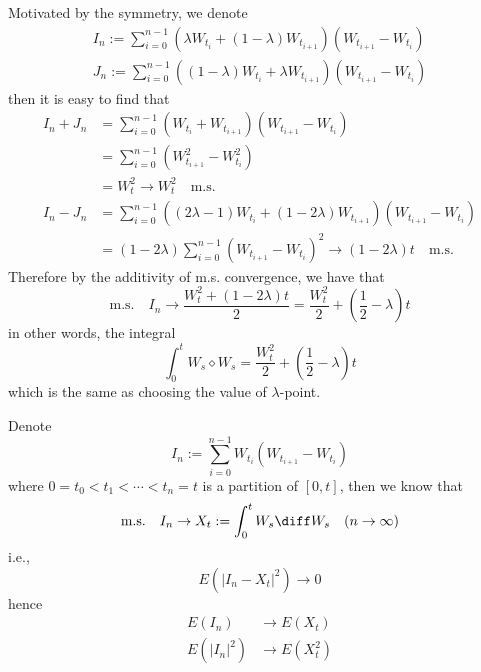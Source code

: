     \problem
    Motivated by the symmetry, we denote
    \newcommand{\sumhead}{\sum_{i=0}^{n-1}}
    \newcommand{\limhead}{\lim_{n\to\infty}}
    \newcommand{\wi}{W_{t_i}}
    \newcommand{\wii}{W_{t_{i+1}}}
    \newcommand{\deltaw}{\wii-\wi}
    \[\begin{aligned}
        I_n:=\sumhead\left(\lambda\wi+(1-\lambda)\wii\right)(\deltaw)\\
        J_n:=\sumhead\left((1-\lambda)\wi+\lambda\wii\right)(\deltaw)
    \end{aligned}\]
    then it is easy to find that
    \[\begin{aligned}
        I_n+J_n&=\sumhead(\wi+\wii)(\deltaw)\\
        &=\sumhead(\wii^2-\wi^2)\\
        &=W_t^2\to W_t^2\quad\text{m.s.}\\
        I_n-J_n&=\sumhead\left((2\lambda-1)\wi+(1-2\lambda)\wii\right)
                         (\deltaw)\\
               &=(1-2\lambda)\sumhead(\deltaw)^2
               \to (1-2\lambda)t\quad\text{m.s.}
    \end{aligned}\]
    Therefore by the additivity of m.s. convergence, we have
    that
    \[\text{m.s.}\quad I_n\to\frac{W_t^2+(1-2\lambda)t}{2}
    =\frac{W_t^2}{2}+\left(\frac{1}{2}-\lambda\right)t\]
    in other words, the integral
    \[\int_0^tW_s\diamond W_s
    =\frac{W_t^2}{2}+\left(\frac{1}{2}-\lambda\right)t\]
    which is the same as choosing the value of $\lambda$-point.

    \problem
    \label{var and e}
    \newcommand{\wj}{W_{t_j}}
    \newcommand{\wjj}{W_{t_{j+1}}}
    \newcommand{\deltawj}{\wjj-\wj}
    Denote
    \[I_n:=\sumhead\wi(\deltaw)\]
    where $0=t_0<t_1<\cdots<t_n=t$ is a partition of $[0,t]$,
    then we know that
    \[\text{m.s.}\quad I_n\to X_t:=\int_0^tW_s\diff W_s
    \quad(n\to\infty)\]
    i.e.,
    \[E(|I_n-X_t|^2)\to 0\]
    hence
    \[\begin{aligned}
        E(I_n)&\to E(X_t)\\
        E(|I_n|^2)&\to E(X_t^2)
    \end{aligned}\]

